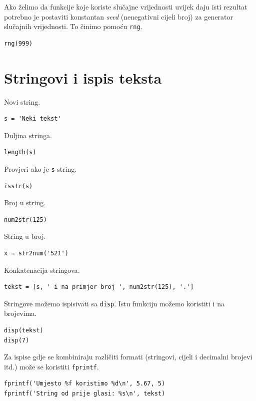 \documentclass[a4paper, 10pt]{article}
\begin{document}
Ako želimo da funkcije koje koriste slučajne vrijednosti uvijek daju isti rezultat potrebno je postaviti konstantan \textit{seed} (nenegativni cijeli broj) za generator slučajnih vrijednosti. To činimo pomoću \texttt{rng}.

\begin{lstlisting}
rng(999)
\end{lstlisting}

\section{Stringovi i ispis teksta}

Novi string.

\begin{lstlisting}
s = 'Neki tekst'
\end{lstlisting}

Duljina stringa.

\begin{lstlisting}
length(s)
\end{lstlisting}

Provjeri ako je \texttt{s} string.

\begin{lstlisting}
isstr(s)
\end{lstlisting}

Broj u string.

\begin{lstlisting}
num2str(125)
\end{lstlisting}

String u broj.

\begin{lstlisting}
x = str2num('521')
\end{lstlisting}

Konkatenacija stringova.

\begin{lstlisting}
tekst = [s, ' i na primjer broj ', num2str(125), '.']
\end{lstlisting}

Stringove možemo ispisivati sa \texttt{disp}. Istu funkciju možemo koristiti i na brojevima.

\begin{lstlisting}
disp(tekst)
disp(7)
\end{lstlisting}

Za ispise gdje se kombiniraju različiti formati (stringovi, cijeli i decimalni brojevi itd.) može se koristiti \texttt{fprintf}.

\begin{lstlisting}
fprintf('Umjesto %f koristimo %d\n', 5.67, 5)
fprintf('String od prije glasi: %s\n', tekst)
\end{lstlisting}
\end{document}

